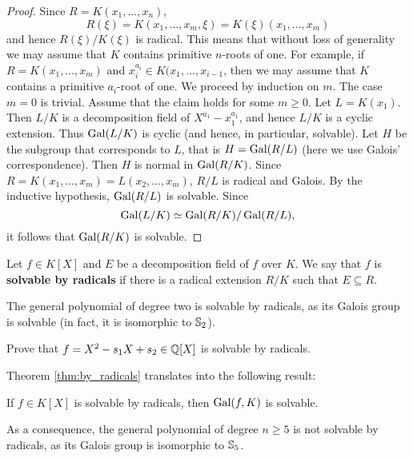 \begin{proof}
    Since
    $R=K(x_1,\dots,x_n)$,  
    \[
    R(\xi)=K(x_1,\dots,x_m,\xi)=K(\xi)(x_1,\dots,x_m)
    \]
    and hence $R(\xi)/K(\xi)$ is radical. 
    This means that
    without loss of generality we may assume that
    $K$ contains primitive $n$-roots of one. For example, 
    if $R=K(x_1,\dots,x_m)$ and $x_i^{a_i}\in K(x_1,\dots,x_{i-1}$, 
    then we may assume that $K$ contains a primitive $a_i$-root of one. We proceed by induction on $m$. 
    The case $m=0$ is trivial. Assume that the claim holds for some $m\geq0$. Let 
    $L=K(x_1)$. Then $L/K$ is a decomposition field of $X^{a_1}-x_1^{a_1}$, and hence
    $L/K$ is a cyclic extension. Thus $\operatorname{Gal}(L/K)$ is cyclic (and hence, in particular, solvable). 
    Let $H$ be the subgroup that corresponds to $L$, that is
    $H=\operatorname{Gal}(R/L)$ (here we use Galois' correspondence). Then $H$ is normal in $\operatorname{Gal}(R/K)$. 
    Since $R=K(x_1,\dots,x_m)=L(x_2,\dots,x_m)$, $R/L$ is radical and Galois. By the inductive hypothesis, 
    $\operatorname{Gal}(R/L)$ is solvable. Since 
    \[
    \operatorname{Gal}(L/K)\simeq \operatorname{Gal}(R/K)/\operatorname{Gal}(R/L),
    \]
    it follows that $\operatorname{Gal}(R/K)$ is solvable. 
\end{proof}

\begin{definition}
    Let $f\in K[X]$ and $E$ be a decomposition field of $f$ over $K$. 
    We say that $f$ is \textbf{solvable by radicals} if
    there is a radical extension $R/K$ such that $E\subseteq R$. 
\end{definition}

The general polynomial of degree two 
is solvable by radicals, as its Galois group 
is solvable (in fact, it is isomorphic to $\mathbb{S}_2$).  

\begin{exercise}
    Prove that $f=X^2-s_1X+s_2\in\mathbb{Q}[X]$ is solvable by radicals. 
\end{exercise}

Theorem \ref{thm:by_radicals} translates into the following result:

\begin{exercise}
    If $f\in K[X]$ is solvable by radicals, then $\operatorname{Gal}(f,K)$ is solvable. 
\end{exercise}

As a consequence, the general polynomial of degree $n\geq5$ 
is not solvable by radicals, as its Galois group is isomorphic to 
$\mathbb{S}_5$. 


